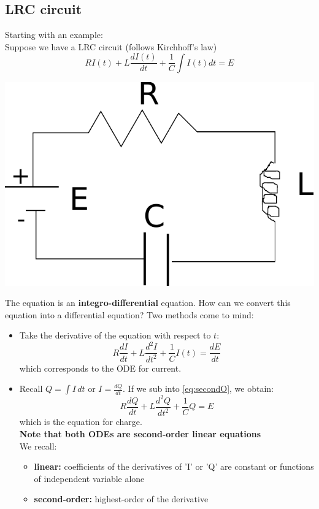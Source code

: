 \subsection{LRC circuit}
\begin{minipage}{0.65\textwidth}
Starting with an example:\\
Suppose we have a LRC circuit (follows Kirchhoff's law)
\begin{equation}
\boxed{RI(t) + L\frac{dI(t)}{dt}+\frac{1}{C}\int I(t) dt=E}
\label{eq:secondO}
\end{equation}
\end{minipage}
\begin{minipage}{0.28\textwidth}
\includegraphics[width=\textwidth]{figs/LRCcircuit.pdf} 
\end{minipage}
\vspace{0.5cm}
The equation is an \textbf{integro-differential} equation.  
How can we convert this equation into a differential equation? Two methods come to mind:
\begin{itemize}
\item Take the derivative of the equation with respect to $t$:
\begin{equation*}
R\frac{dI}{dt}+L\frac{d^2I}{dt^2}+\frac{1}{C}I(t)=\frac{dE}{dt}
\end{equation*}
which corresponds to the ODE for current.
\item Recall $Q=\int I\,dt$ or $I=\frac{dQ}{dt}$. If we sub into \eqref{eq:secondO}, we obtain:
\begin{equation*}
R\frac{dQ}{dt}+L\frac{d^2Q}{dt^2}+\frac{1}{C}Q=E
\end{equation*}
which is the equation for charge.\\
\textbf{Note that both ODEs are second-order linear equations}\\
We recall:
\begin{itemize}
\item \textbf{linear:} coefficients of the derivatives of 'I' or 'Q' are constant or functions of independent variable alone
\item  \textbf{second-order:} highest-order of the derivative 
\end{itemize}
 

\end{itemize}



